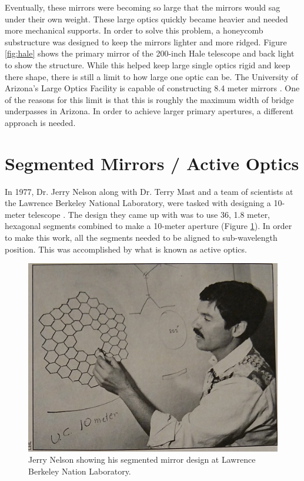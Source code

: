 Eventually, these mirrors were becoming so
large that the mirrors would sag under their own weight.  These large optics quickly became heavier and needed
more mechanical supports.  In order to solve this problem, a honeycomb substructure was designed to keep the
mirrors lighter and more ridged.  Figure \ref{fig:hale} shows the primary mirror of the 200-inch Hale telescope
and back light to show the structure.  While this helped keep large single optics rigid and keep there shape, there is still a limit
to how large one optic can be.  The University of Arizona's Large Optics Facility is capable of constructing
8.4 meter mirrors \cite{LOFTSystems.}.  One of the reasons for this limit is that this is roughly the maximum
width of bridge underpasses in Arizona.  In order to achieve larger primary apertures, a different approach is
needed.




\section{Segmented Mirrors / Active Optics}
\label{sec:seg_mirror}

In 1977, Dr. Jerry Nelson along with Dr. Terry Mast and a team of scientists at the Lawrence Berkeley National Laboratory, were tasked with designing a 10-meter telescope \cite{BeatingObservatory}.  The design they came up with was to use 36, 1.8 meter, hexagonal segments combined to make a 10-meter aperture (Figure \ref{fig:jerry_nelson}).  In order to make this work, all the segments needed to be aligned to sub-wavelength position.  This was accomplished by what is known as active optics.

\begin{figure}[H]
\centering
\includegraphics[width=12 cm]{../Figures/Jerry Nelson}
\caption{Jerry Nelson showing his segmented mirror design at Lawrence Berkeley Nation Laboratory.}
\label{fig:jerry_nelson}
\end{figure}

